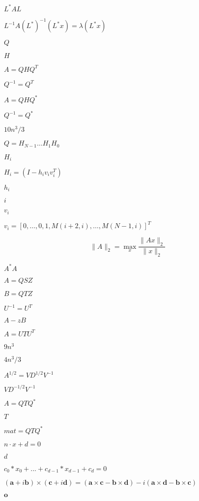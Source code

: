 \documentclass{article}
\begin{document}
$ L^{*} A L $
\pagebreak

$ L^{-1} A (L^*)^{-1} (L^* x) = \lambda (L^* x) $
\pagebreak

$ Q $
\pagebreak

$ H $
\pagebreak

$ A = Q H Q^T $
\pagebreak

$ Q^{-1} = Q^T $
\pagebreak

$ A = Q H Q^* $
\pagebreak

$ Q^{-1} = Q^* $
\pagebreak

$ 10n^3/3 $
\pagebreak

$ Q = H_{N-1} \ldots H_1 H_0 $
\pagebreak

$ H_i $
\pagebreak

$ H_i = (I - h_i v_i v_i^T) $
\pagebreak

$ h_i $
\pagebreak

$ i $
\pagebreak

$ v_i $
\pagebreak

$ v_i = [ 0, \ldots, 0, 1, M(i+2,i), \ldots, M(N-1,i) ]^T $
\pagebreak

\[ \|A\|_2 = \max_x \frac{\|Ax\|_2}{\|x\|_2} \]
\pagebreak

$ A^*A $
\pagebreak

$ A = Q S Z $
\pagebreak

$ B = Q T Z $
\pagebreak

$ U^{-1} = U^T $
\pagebreak

$ A - z B $
\pagebreak

$ A = U T U^T $
\pagebreak

$ 9n^3 $
\pagebreak

$ 4n^3/3 $
\pagebreak

$ A^{1/2} = V D^{1/2} V^{-1} $
\pagebreak

$ V D^{-1/2} V^{-1} $
\pagebreak

$ A = Q T Q^* $
\pagebreak

$ T $
\pagebreak

$ mat = Q T Q^* $
\pagebreak

$ n \cdot x + d = 0 $
\pagebreak

$ d $
\pagebreak

$ c_0*x_0 + ... + c_{d-1}*x_{d-1} + c_d = 0 $
\pagebreak

$ (\mathbf{a}+i\mathbf{b}) \times (\mathbf{c}+i\mathbf{d}) = (\mathbf{a} \times \mathbf{c} - \mathbf{b} \times \mathbf{d}) - i(\mathbf{a} \times \mathbf{d} - \mathbf{b} \times \mathbf{c})$
\pagebreak

$ \mathbf{o} $
\pagebreak
\end{document}
